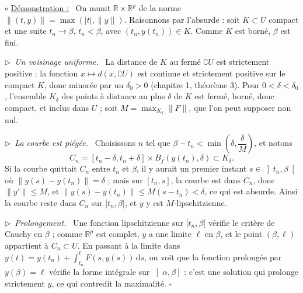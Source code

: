 \documentclass[a4paper,twoside]{report}
\newenvironment{demo}%
 {\par\needspace{4\baselineskip}\vspace{1mm}\noindent$\circ$ \underline{Démonstration :}~\setlength{\parskip}{3pt plus 1pt}}%
 {\hfill$\square$\par\vspace{2mm}}
\newcommand{\etape}[1]{\par\smallskip\noindent$\triangleright$~\textit{#1}~}
\newcommand{\R}{\mathbb{R}}
\newcommand{\dd}{\mathrm{d}}                      %
\newcommand{\norme}[1]{\lVert #1 \rVert}         %
\newcommand{\Bf}{B_{f}}                           %
\begin{document}
\begin{demo}
On munit $\R \times \R^{p}$ de la norme $\norme{(t, y)} = \max(|t|, \norme{y})$. Raisonnons par l'absurde : soit $K \subset U$ compact et une suite $t_{n} \to \beta$, $t_{n} < \beta$, avec $(t_{n}, y(t_{n})) \in K$. Comme $K$ est borné, $\beta$ est fini.

\etape{Un voisinage uniforme.} La distance de $K$ au fermé $\complement U$ est strictement positive : la fonction $x \mapsto d(x, \complement U)$ est continue et strictement positive sur le compact $K$, donc minorée par un $\delta_{0} > 0$ (chapitre 1, théorème 3). Pour $0 < \delta < \delta_{0}$, l'ensemble $K_{\delta}$ des points à distance au plus $\delta$ de $K$ est fermé, borné, donc compact, et inclus dans $U$ ; soit $M = \max_{K_{\delta}}\norme{F}$, que l'on peut supposer non nul.

\etape{La courbe est piégée.} Choisissons $n$ tel que $\beta - t_{n} < \min\left(\delta, \dfrac{\delta}{M}\right)$, et notons
\[ C_{n} = [t_{n} - \delta, t_{n} + \delta] \times \Bf(y(t_{n}), \delta) \subset K_{\delta}. \]
 Si la courbe quittait $C_{n}$ entre $t_{n}$ et $\beta$, il y aurait un premier instant $s \in \left]t_{n}, \beta\right[$ où $\norme{y(s) - y(t_{n})} = \delta$ ; mais sur $[t_{n}, s]$, la courbe est dans $C_{n}$, donc $\norme{y'} \leqslant M$, et $\norme{y(s) - y(t_{n})} \leqslant M(s - t_{n}) < \delta$, ce qui est absurde. Ainsi la courbe reste dans $C_{n}$ sur $[t_{n}, \beta[$, et $y$ y est $M$-lipschitzienne.

\etape{Prolongement.} Une fonction lipschitzienne sur $[t_{n}, \beta[$ vérifie le critère de Cauchy en $\beta$ ; comme $\R^{p}$ est complet, $y$ a une limite $\ell$ en $\beta$, et le point $(\beta, \ell)$ appartient à $C_{n} \subset U$. En passant à la limite dans $y(t) = y(t_{n}) + \displaystyle\int_{t_{n}}^{t} F(s, y(s))\,\dd s$, on voit que la fonction prolongée par $y(\beta) = \ell$ vérifie la forme intégrale sur $\left]\alpha, \beta\right]$ : c'est une solution qui prolonge strictement $y$, ce qui contredit la maximalité.
\end{demo}
\end{document}
